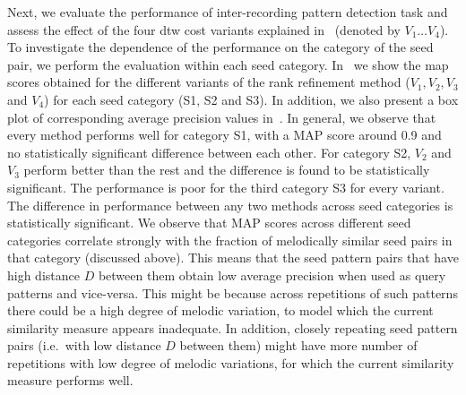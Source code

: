 Next, we evaluate the performance of inter-recording pattern detection task and assess the effect of the four \gls{dtw} cost variants explained in~ (denoted by $V_1 \dots V_4$). To investigate the dependence of the performance on the category of the seed pair, we perform the evaluation within each seed category. In~ we show the \gls{map} scores obtained for the different variants of the rank refinement method ($V_1, V_2, V_3$ and $V_4$) for each seed category (S1, S2 and S3). In addition, we also present a box plot of corresponding average precision values in~. In general, we observe that every method performs well for category S1, with a MAP score around 0.9 and no statistically significant difference between each other. For category S2, $V_2$ and $V_3$ perform better than the rest and the difference is found to be statistically significant. The performance is poor for the third category S3 for every variant. The difference in performance between any two methods across seed categories is statistically significant. We observe that MAP scores across different seed categories correlate strongly with the fraction of melodically similar seed pairs in that category (discussed above). This means that the seed pattern pairs that have high distance $D$ between them obtain low average precision when used as query patterns and vice-versa. This might be because across repetitions of such patterns there could be a high degree of melodic variation, to model which the current similarity measure appears inadequate. In addition, closely repeating seed pattern pairs (i.e.~with low distance $D$ between them) might have more number of repetitions with low degree of melodic variations, for which the current similarity measure performs well. 


